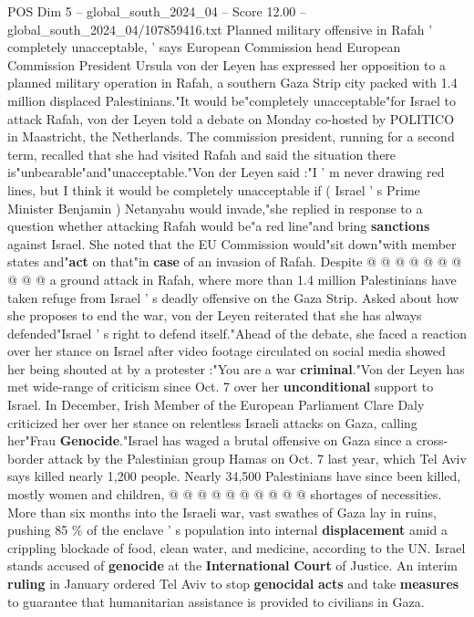 \begin{textsample}{POS Dim 5 – global\_south\_2024\_04 – Score 12.00 – global\_south\_2024\_04/107859416.txt}  \label{ex:f5_pos_331}
Planned military offensive in Rafah ' completely unacceptable, ' says European Commission head European Commission President Ursula von der Leyen has expressed her opposition to a planned military operation in Rafah, a southern Gaza Strip city packed with 1.4 million displaced Palestinians."It would be"completely unacceptable"for Israel to attack Rafah, von der Leyen told a debate on Monday co-hosted by POLITICO in Maastricht, the Netherlands.
The commission president, running for a second term, recalled that she had visited Rafah and said the situation there is"unbearable"and"unacceptable."Von der Leyen said :"I ' m never drawing red lines, but I think it would be completely unacceptable if ( Israel ' s Prime Minister Benjamin ) Netanyahu would invade,"she replied in response to a question whether attacking Rafah would be"a red line"and bring \textbf{sanctions} against Israel.
She noted that the EU Commission would"sit down"with member states and"\textbf{act} on that"in \textbf{case} of an invasion of Rafah.
Despite @ @ @ @ @ @ @ @ @ @ a ground attack in Rafah, where more than 1.4 million Palestinians have taken refuge from Israel ' s deadly offensive on the Gaza Strip.
Asked about how she proposes to end the war, von der Leyen reiterated that she has always defended"Israel ' s right to defend itself."Ahead of the debate, she faced a reaction over her stance on Israel after video footage circulated on social media showed her being shouted at by a protester :"You are a war \textbf{criminal}."Von der Leyen has met wide-range of criticism since Oct. 7 over her \textbf{unconditional} support to Israel.
In December, Irish Member of the European Parliament Clare Daly criticized her over her stance on relentless Israeli attacks on Gaza, calling her"Frau \textbf{Genocide}."Israel has waged a brutal offensive on Gaza since a cross-border attack by the Palestinian group Hamas on Oct. 7 last year, which Tel Aviv says killed nearly 1,200 people.
Nearly 34,500 Palestinians have since been killed, mostly women and children, @ @ @ @ @ @ @ @ @ @ shortages of necessities.
More than six months into the Israeli war, vast swathes of Gaza lay in ruins, pushing 85 \% of the enclave ' s population into internal \textbf{displacement} amid a crippling blockade of food, clean water, and medicine, according to the UN.
Israel stands accused of \textbf{genocide} at the \textbf{International} \textbf{Court} of Justice.
An interim \textbf{ruling} in January ordered Tel Aviv to stop \textbf{genocidal} \textbf{acts} and take \textbf{measures} to guarantee that humanitarian assistance is provided to civilians in Gaza.

\end{textsample}
